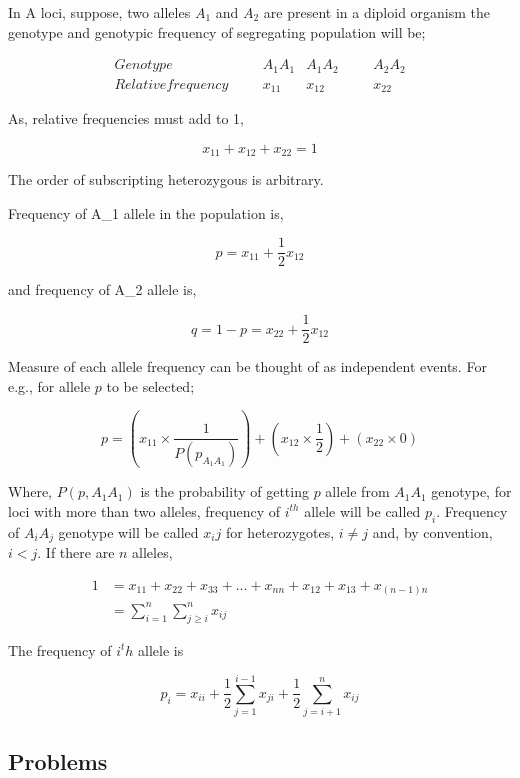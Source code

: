 \documentclass[nofonts,]{tufte-handout}
\begin{document}
In A loci, suppose, two alleles \(A_1\) and \(A_2\) are present in a
diploid organism the genotype and genotypic frequency of segregating
population will be;

\[
\begin{aligned}
Genotype \hspace{20pt} & A_1A_1 & A_1A_2 \hspace{20pt} & A_2A_2 \\
Relative frequency \hspace{20pt} & x_{11} & x_{12} \hspace{20pt} & x_{22}
\end{aligned}
\]

As, relative frequencies must add to 1,

\[
x_{11} + x_{12} + x_{22} = 1
\]

The order of subscripting heterozygous is arbitrary.

Frequency of A\_1 allele in the population is,

\[
p = x_{11} + \frac{1}{2}x_{12}
\]

and frequency of A\_2 allele is,

\[
q = 1-p = x_{22} + \frac{1}{2}x_{12}
\]

Measure of each allele frequency can be thought of as independent
events. For e.g., for allele \(p\) to be selected;

\[
p = \left(x_{11} \times \frac{1}{P(p_{A_1A_1})}\right) + \left(x_{12} \times \frac{1}{2}\right) + (x_{22} \times 0)
\]

Where, \(P(p, A_1A_1)\) is the probability of getting \(p\) allele from
\(A_1A_1\) genotype, for loci with more than two alleles, frequency of
\(i^{th}\) allele will be called \(p_i\). Frequency of \(A_iA_j\)
genotype will be called \(x_ij\) for heterozygotes, \(i\neq j\) and, by
convention, \(i<j\). If there are \(n\) alleles,

\[
\begin{aligned}
1 &= x_{11} + x_{22} + x_{33} + ... + x_{nn} + x_{12} + x_{13} + x_{(n-1)n} \\
  &= \sum^n_{i=1}\sum^n_{j\geq i}{x_{ij}}
\end{aligned}
\]

The frequency of \(i^th\) allele is

\[
p_i = x_{ii} + \frac{1}{2}\sum^{i-1}_{j = 1}{x_{ji}} + \frac{1}{2}\sum^n_{j = i+1}{x_{ij}}
\]

\hypertarget{problems}{%
\subsection{Problems}\label{problems}}
\end{document}
